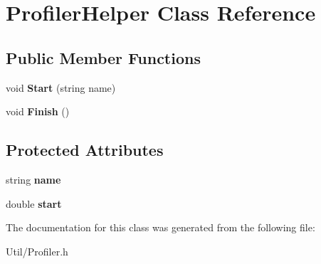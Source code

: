 \hypertarget{class_profiler_helper}{\section{\-Profiler\-Helper \-Class \-Reference}
\label{class_profiler_helper}
}
\subsection*{\-Public \-Member \-Functions}
\begin{DoxyCompactItemize}
\item 
\hypertarget{class_profiler_helper_a08d89456f48b8d2e4b5239dcfa7527a1}{void {\bfseries \-Start} (string name)}\label{class_profiler_helper_a08d89456f48b8d2e4b5239dcfa7527a1}

\item 
\hypertarget{class_profiler_helper_a5e125e2c8280418c539269438e97568a}{void {\bfseries \-Finish} ()}\label{class_profiler_helper_a5e125e2c8280418c539269438e97568a}

\end{DoxyCompactItemize}
\subsection*{\-Protected \-Attributes}
\begin{DoxyCompactItemize}
\item 
\hypertarget{class_profiler_helper_a6676fb76738693e3c0cb628ca43de7f1}{string {\bfseries name}}\label{class_profiler_helper_a6676fb76738693e3c0cb628ca43de7f1}

\item 
\hypertarget{class_profiler_helper_a624a70218836e1560374ba9dc386624a}{double {\bfseries start}}\label{class_profiler_helper_a624a70218836e1560374ba9dc386624a}

\end{DoxyCompactItemize}


\-The documentation for this class was generated from the following file\-:\begin{DoxyCompactItemize}
\item 
\-Util/\-Profiler.\-h\end{DoxyCompactItemize}
